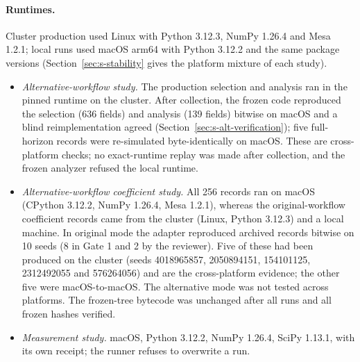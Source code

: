 \paragraph{Runtimes.} Cluster production used Linux with Python 3.12.3, NumPy
1.26.4 and Mesa 1.2.1; local runs used macOS arm64 with Python 3.12.2 and the
same package versions (Section~\ref{sec:s-stability} gives the platform mixture
of each study).
\begin{itemize}
\item \emph{Alternative-workflow study.} The production selection and analysis
ran in the pinned runtime on the cluster. After collection, the frozen code
reproduced the selection (636 fields) and analysis (139 fields) bitwise on macOS
and a blind reimplementation agreed (Section~\ref{sec:s-alt-verification}); five
full-horizon records were re-simulated byte-identically on macOS. These are
cross-platform checks; no exact-runtime replay was made after collection, and
the frozen analyzer refused the local runtime.
\item \emph{Alternative-workflow coefficient study.} All 256 records ran on macOS
(CPython 3.12.2, NumPy 1.26.4, Mesa 1.2.1), whereas the original-workflow
coefficient records came from the cluster (Linux, Python 3.12.3) and a local
machine. In original mode the adapter reproduced archived records bitwise on 10
seeds (8 in Gate 1 and 2 by the reviewer). Five of these had been produced on the
cluster (seeds 4018965857, 2050894151, 154101125, 2312492055 and 576264056) and
are the cross-platform evidence; the other five were macOS-to-macOS. The
alternative mode was not tested across platforms. The frozen-tree bytecode was
unchanged after all runs and all frozen hashes verified.
\item \emph{Measurement study.} macOS, Python 3.12.2, NumPy 1.26.4, SciPy 1.13.1,
with its own receipt; the runner refuses to overwrite a run.
\end{itemize}

